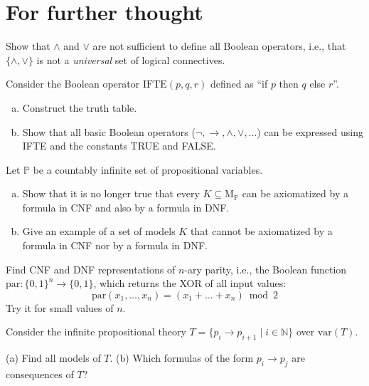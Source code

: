 \section*{For further thought}


\begin{problem}
    
    Show that $\wedge$ and $\vee$ are not sufficient to define all Boolean operators, i.e., that $\{\wedge,\vee\}$ is not a \emph{universal} set of logical connectives.

\end{problem}


\begin{problem}
    
    Consider the Boolean operator $\mathrm{IFTE}(p, q, r)$ defined as “if $p$ then $q$ else $r$”. 
    \begin{enumerate}[(a)]
        \item Construct the truth table.
        \item Show that all basic Boolean operators ($\neg, \to, \wedge,\vee,\dots$) can be expressed using IFTE and the constants TRUE and FALSE.
    \end{enumerate}

\end{problem}


\begin{problem} 
    
    Let $\mathbb P$ be a countably infinite set of propositional variables.    
    \begin{enumerate}[(a)]
        \item Show that it is no longer true that every $K\subseteq \mathrm{M}_\mathbb P$ can be axiomatized by a formula in CNF and also by a formula in DNF.
        \item Give an example of a set of models $K$ that cannot be axiomatized by a formula in CNF nor by a formula in DNF.
    \end{enumerate}

\end{problem}


\begin{problem} 
    
    Find CNF and DNF representations of $n$-ary parity, i.e., the Boolean function $\mathrm{par}\colon\{0,1\}^n\to \{0,1\}$,
    which returns the XOR of all input values:
    $$
    \mathrm{par}(x_1,\dots,x_n)=(x_1+\dots+x_n)\bmod 2
    $$
    Try it for small values of $n$.

\end{problem}


\begin{problem}

    Consider the infinite propositional theory $T=\{p_i \to p_{i+1}\mid i\in \mathbb{N}\}$ over $\mathrm{var}(T)$. 
    
    (a) Find all models of $T$. \hfill (b) Which formulas of the form $p_i \to p_j$ are consequences of $T$?    

\end{problem}
